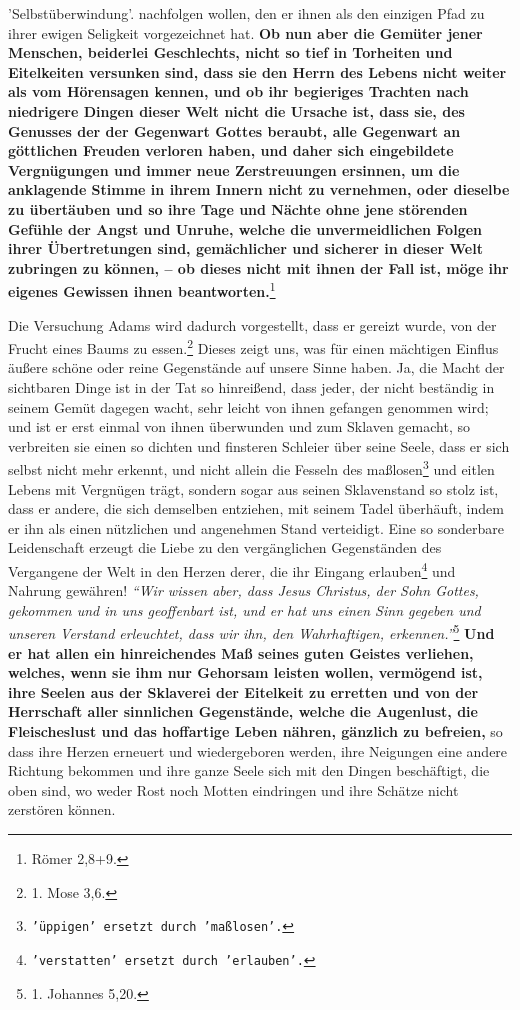 {{{'Selbstüberwindung'.}}
nachfolgen wollen, den er ihnen
als den einzigen Pfad zu ihrer ewigen Seligkeit vorgezeichnet hat. \textbf{Ob
nun aber
die Gemüter jener Menschen, beiderlei Geschlechts, nicht so tief in Torheiten
und
Eitelkeiten versunken sind, dass sie den Herrn des Lebens nicht weiter als vom
Hörensagen kennen, und ob ihr begieriges Trachten nach niedrigere Dingen dieser
Welt nicht die Ursache ist, dass sie, des Genusses der der Gegenwart Gottes
beraubt,
alle Gegenwart an göttlichen Freuden verloren haben, und daher sich
eingebildete Vergnügungen und immer neue Zerstreuungen ersinnen, um die
anklagende Stimme in ihrem Innern nicht zu vernehmen, oder dieselbe zu
übertäuben und so ihre Tage und Nächte ohne jene störenden Gefühle der Angst
und Unruhe, welche die unvermeidlichen Folgen ihrer Übertretungen sind,
gemächlicher und sicherer in dieser Welt zubringen zu können, -- ob dieses nicht
mit ihnen der Fall ist, möge ihr eigenes Gewissen ihnen
beantworten.}\footnote{Römer 2,8+9.}

\medskip

Die Versuchung Adams wird dadurch vorgestellt, dass er gereizt wurde, von der
Frucht eines Baums zu essen.\footnote{1. Mose 3,6.}
Dieses zeigt uns, was für
einen mächtigen Einflus äußere schöne oder reine Gegenstände auf unsere Sinne
haben. Ja, die Macht der sichtbaren Dinge ist in der Tat so hinreißend, dass
jeder, der nicht beständig in seinem Gemüt dagegen wacht, sehr leicht von
ihnen gefangen genommen wird; und ist er erst einmal von ihnen überwunden und
zum Sklaven gemacht, so verbreiten sie einen so dichten
und finsteren Schleier
über seine Seele, dass er sich selbst nicht mehr erkennt, und nicht allein die
Fesseln des maßlosen\footnote{\texttt{'üppigen' ersetzt durch 'maßlosen'.}} und
eitlen Lebens mit
Vergnügen trägt, sondern sogar aus
seinen Sklavenstand so stolz ist, dass er andere, die sich
demselben entziehen,
mit seinem Tadel überhäuft, indem er ihn als einen nützlichen und angenehmen
Stand verteidigt. Eine so sonderbare Leidenschaft erzeugt die Liebe zu den
vergänglichen Gegenständen des Vergangene der Welt in den Herzen derer, die ihr
Eingang erlauben\footnote{\texttt{'verstatten' ersetzt durch 'erlauben'.}} und
Nahrung gewähren!
\textit{"`Wir wissen aber, dass Jesus Christus,
der Sohn Gottes, gekommen und in uns geoffenbart ist, und er hat uns einen Sinn
gegeben und unseren Verstand erleuchtet, dass wir ihn, den Wahrhaftigen,
erkennen."'}\footnote{1. Johannes 5,20.}
\textbf{Und er hat allen ein hinreichendes Maß seines
guten Geistes verliehen, welches, wenn sie ihm nur Gehorsam leisten wollen,
vermögend ist, ihre Seelen aus der Sklaverei der Eitelkeit zu erretten und von
der Herrschaft aller sinnlichen Gegenstände, welche die Augenlust, die
Fleischeslust und das hoffartige Leben nähren, gänzlich zu befreien,} so dass
ihre
Herzen erneuert und wiedergeboren werden, ihre Neigungen
eine andere Richtung
bekommen und ihre ganze Seele sich mit den Dingen beschäftigt, die oben sind,
wo weder Rost noch Motten eindringen und ihre Schätze nicht zerstören können.

}
